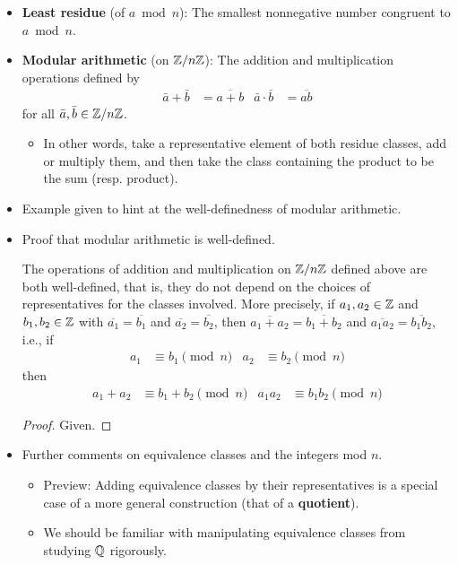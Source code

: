 \documentclass[../notes.tex]{subfiles}
\begin{document}
\begin{itemize}
    \item \textbf{Least residue} (of $a\bmod n$): The smallest nonnegative number congruent to $a\bmod n$.
    \item \textbf{Modular arithmetic} (on $\mathbb{Z}/n\mathbb{Z}$): The addition and multiplication operations defined by
    \begin{align*}
        \bar{a}+\bar{b} &= \overline{a+b}&
        \bar{a}\cdot\bar{b} &= \overline{ab}
    \end{align*}
    for all $\bar{a},\bar{b}\in\mathbb{Z}/n\mathbb{Z}$.
    \begin{itemize}
        \item In other words, take a representative element of both residue classes, add or multiply them, and then take the class containing the product to be the sum (resp. product).
    \end{itemize}
    \item Example given to hint at the well-definedness of modular arithmetic.
    \item Proof that modular arithmetic is well-defined.
    \begin{theorem}\label{trm:0.3}
        The operations of addition and multiplication on $\mathbb{Z}/n\mathbb{Z}$ defined above are both well-defined, that is, they do not depend on the choices of representatives for the classes involved. More precisely, if $a_1,a_2\in\mathbb{Z}$ and $b_1,b_2\in\mathbb{Z}$ with $\overline{a_1}=\overline{b_1}$ and $\overline{a_2}=\overline{b_2}$, then $\overline{a_1+a_2}=\overline{b_1+b_2}$ and $\overline{a_1a_2}=\overline{b_1b_2}$, i.e., if
        \begin{align*}
            a_1 &\equiv b_1\pmod n&
            a_2 &\equiv b_2\pmod n
        \end{align*}
        then
        \begin{align*}
            a_1+a_2 &\equiv b_1+b_2\pmod n&
            a_1a_2 &\equiv b_1b_2\pmod n
        \end{align*}
        \begin{proof}
            Given.
        \end{proof}
    \end{theorem}
    \item Further comments on equivalence classes and the integers mod $n$.
    \begin{itemize}
        \item Preview: Adding equivalence classes by their representatives is a special case of a more general construction (that of a \textbf{quotient}).
        \item We should be familiar with manipulating equivalence classes from studying $\mathbb{Q}$ rigorously.

\end{itemize}
\end{itemize}
\end{document}
